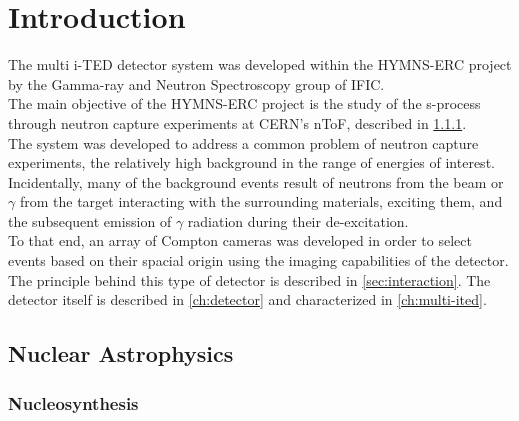 \chapter{Introduction}\label{ch:background}

The multi \ac{i-TED} detector system was developed within the \ac{HYMNS}-\ac{ERC} project by the Gamma-ray and Neutron Spectroscopy group of \ac{IFIC}.\\

The main objective of the \ac{HYMNS}-\ac{ERC} project is the study of the s-process through neutron capture experiments at \ac{CERN}'s \ac{nToF}, described in \ref{sec:nucleosynthesis}.\\

The system was developed to address a common problem of neutron capture experiments, the relatively high background in the range of energies of interest. Incidentally, many of the background events result of neutrons from the beam or $\gamma$ from the target interacting with the surrounding materials, exciting them, and the subsequent emission of $\gamma$ radiation during their de-excitation.\\

To that end, an array of Compton cameras was developed in order to select events based on their spacial origin using the imaging capabilities of the detector. The principle behind this type of detector is described in \ref{sec:interaction}. The detector itself is described in \ref{ch:detector} and characterized in \ref{ch:multi-ited}.\\

\section{Nuclear Astrophysics}\label{sec:astrophysics}

\subsection{Nucleosynthesis}\label{sec:nucleosynthesis}

